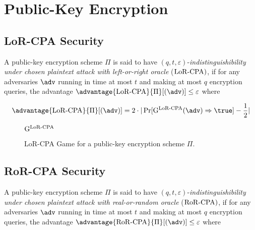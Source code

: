 \newpage
\section{Public-Key Encryption}

\subsection{LoR-CPA Security}
A public-key encryption scheme  $\Pi$ is said to have $(q,t,\varepsilon)$-\textit{indistinguishibility under chosen plaintext attack with left-or-right oracle} ($\mathrm{LoR\textrm-CPA})$, if for any adversaries $\adv$ running in time at most $t$ and making at most $q$ encryption queries, the advantage $\advantage{\lorcpa}{\Pi}[(\adv)] \leq \varepsilon$ where 

$$
\advantage{\lorcpa}{\Pi}[(\adv)] = 2 \cdot | \Pr[\mathrm{G}^{\lorcpa}(\adv) \Rightarrow \true ] - \frac{1}{2} | 
$$ 


\begin{figure}[h]
\centering
\begin{codeframe}[colback = white, width=9.5cm, height=4.75cm]{$\mathrm{G}^{\mathrm{LoR\textrm-CPA}}$}

\begin{pchstack}[space=0.5cm]
\begin{pcvstack}[space=0.3cm]

\end{pcvstack}
\end{pchstack}
\end{codeframe}
\caption{LoR-CPA Game for a public-key encryption scheme $\Pi$. }
\label{fig:lorcpa-game-pkc}
\end{figure}



\subsection{RoR-CPA Security}
A public-key encryption scheme  $\Pi$ is said to have $(q,t,\varepsilon)$-\textit{indistinguishibility under chosen plaintext attack with real-or-random oracle} ($\mathrm{RoR\textrm-CPA})$, if for any adversaries $\adv$ running in time at most $t$ and making at most $q$ encryption queries, the advantage $\advantage{\rorcpa}{\Pi}[(\adv)] \leq \varepsilon$ where 


